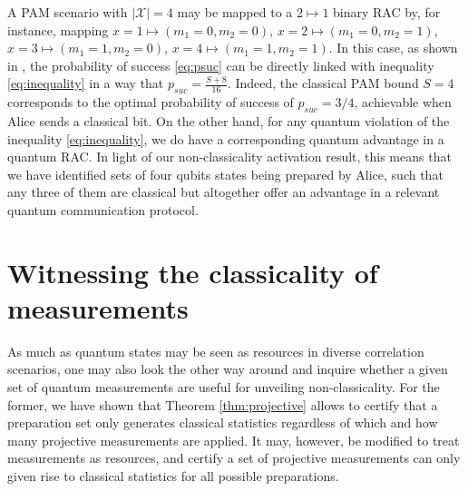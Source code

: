 \documentclass[a4paper,preprintnumbers,floatfix,superscriptaddress,pra,twocolumn,showpacs,notitlepage,longbibliography]{revtex4-2}
\begin{document}
       
    
        A PAM scenario with $\vert \mathcal{X} \vert = 4 $ may be mapped to a $2 \mapsto 1$ binary RAC by, for instance, mapping $x = 1 \mapsto (m_1 = 0, m_2 = 0)$, $x = 2 \mapsto (m_1 = 0, m_2 = 1)$, $x = 3 \mapsto (m_1 = 1, m_2 = 0)$, $x = 4 \mapsto (m_1 = 1, m_2 = 1)$. In this case, as shown in \cite{pawlowski-qkd-2011}, the probability of success \eqref{eq:psuc} can be directly linked with inequality \eqref{eq:inequality} in a way that $p_{suc} = \frac{S+8}{16}$. Indeed, the classical PAM bound $S=4$ corresponds to the optimal probability of success of $p_{suc}=3/4$, achievable when Alice sends a classical bit. On the other hand, for any quantum violation of the inequality \eqref{eq:inequality}, we do have a corresponding quantum advantage in a quantum RAC. In light of our non-classicality activation result, this means that we have identified sets of four qubits states being prepared by Alice, such that any three of them are classical but altogether offer an advantage in a relevant quantum communication protocol.
    
    

\section{Witnessing the classicality of measurements}

    As much as quantum states may be seen as resources in diverse correlation scenarios, one may also look the other way around and inquire whether a given set of quantum measurements are useful for unveiling non-classicality. For the former, we have shown that Theorem \ref{thm:projective} allows to certify  that a preparation set only generates classical statistics regardless of which and how many projective measurements are applied. It may, however, be modified to treat measurements as resources, and certify a set of projective measurements can only given rise to classical statistics for all possible preparations.
\end{document}
